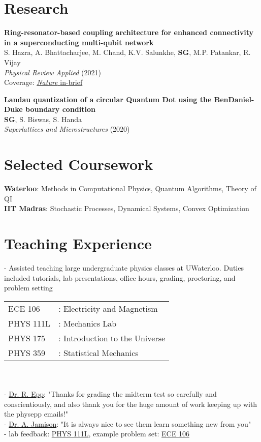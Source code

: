 \documentclass[margin,line]{res}
\begin{document}
\begin{resume}
\section{\sc Research}
{\bf Ring-resonator-based coupling architecture for enhanced connectivity in a superconducting multi-qubit network} \href{https://journals.aps.org/prapplied/abstract/10.1103/PhysRevApplied.16.024018?ft=1}{\sf[doi]}\\
S. Hazra, A. Bhattacharjee, M. Chand, K.V. Salunkhe, {\bf SG}, M.P. Patankar, R. Vijay\\
\emph{Physical Review Applied} (2021)\\
Coverage: \href{https://www.nature.com/articles/s41578-021-00373-1}{\emph{Nature} \textsf{in-brief}}


{\bf Landau quantization of a circular Quantum Dot using the BenDaniel-Duke boundary condition} \href{https://doi.org/10.1016/j.spmi.2020.106693}{\sf[doi]}\\
{\bf SG}, S. Biswas, S. Handa\\
\emph{Superlattices and Microstructures} (2020)

\section{\sc Selected Coursework}
{\bf Waterloo}: Methods in Computational Physics, Quantum Algorithms, Theory of QI\\
{\bf IIT Madras}: Stochastic Processes, Dynamical Systems, Convex Optimization

\section{\sc Teaching Experience}
- Assisted teaching large undergraduate physics classes at UWaterloo. Duties included tutorials, lab presentations, office hours, grading, proctoring, and problem setting\\
\begin{tabular}{ll}
    \textsf{ECE 106} & : Electricity and Magnetism \\
    \textsf{PHYS 111L} & : Mechanics Lab \\
    \textsf{PHYS 175} & : Introduction to the Universe \\
    \textsf{PHYS 359} & : Statistical Mechanics 
\end{tabular}\\\\
- \href{https://uwaterloo.ca/astrophysics-centre/people-profiles/richard-epp}{\sffamily Dr. R. Epp}: "Thanks for grading the midterm test so carefully and conscientiously, and also thank you for the huge amount of work keeping up with the physepp emails!"\\
- \href{https://uwaterloo.ca/physics-astronomy/profile/alanj}{\sffamily Dr. A. Jamison}: "It is always nice to see them learn something new from you"\\
- lab feedback: \href{https://sriramgkn.github.io/docs/phys111L_feedback2.pdf}{\sffamily PHYS 111L}, example problem set: \href{https://sriramgkn.github.io/docs/ECE106_Problems.pdf}{\sffamily ECE 106}


\end{resume}
\end{document}
